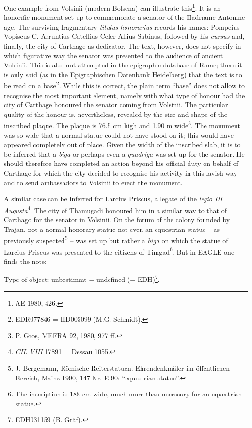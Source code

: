 \documentclass[amsthm,ebook]{saparticle}
\begin{document}
One example from Volsinii (modern Bolsena) can illustrate this\footnote{AE 1980, 426.}. It is an honorific 
monument set up to commemorate a senator of the Hadrianic-Antonine age. The surviving 
fragmentary \textit{titulus honorarius }records his names: Pompeius Vopiscus C. 
Arruntius Catellius Celer Allius Sabinus, followed by his \textit{cursus }and, 
finally, the city of Carthage as dedicator. The text, however, does not specify 
in which figurative way the senator was presented to the audience of ancient Volsinii. 
This is also not attempted in the epigraphic database of Rome; there it is only 
said (as in the Epigraphischen Datenbank Heidelberg) that the text is to be read 
on a base\footnote{EDR077846 = HD005099 (M.G. Schmidt).}. While this is correct, the plain term ``base'' does not allow to recognise 
the most important element, namely with what type of honour had the city of Carthage 
honoured the senator coming from Volsinii. The particular quality of the honour 
is, nevertheless, revealed by the size and shape of the inscribed plaque. The plaque 
is 76.5 cm high and 1.90 m wide\footnote{P. Gros, MEFRA 92, 1980, 977 ff.}. The monument was so wide that a normal statue 
could not have stood on it; this would have appeared completely out of place. Given 
the width of the inscribed slab, it is to be inferred that a \textit{biga }or perhaps 
even a \textit{quadriga} was set up for the senator\textit{.} He should therefore 
have completed an action beyond his official duty on behalf of Carthage for which 
the city decided to recognise his activity in this lavish way and to send ambassadors 
to Volsinii to erect the monument.      

A similar case can be inferred for Larcius Priscus, a legate of the \textit{legio 
III Augusta}\footnote{\emph{CIL VIII} 17891 = Dessau 1055.}. The city of Thamugadi honoured him in a similar way to that of Carthago 
for the senator in Volsinii. On the forum of the colony founded by Trajan, not 
a normal honorary statue not even an equestrian statue – as previously suspected\footnote{\label{note:18}J. Bergemann, Römische Reiterstatuen. Ehrendenkmäler im öffentlichen Bereich, Mainz 1990, 147 Nr. E 90:  ``equestrian statue''.} 
– was set up but rather a \textit{biga }on which the statue of Larcius Priscus 
was presented to the citizens of Timgad\footnote{The inscription is 188 cm wide, much more than necessary for an equestrian statue.}. But in EAGLE one finds the note: 

Type of object: unbestimmt = undefined (= EDH)\footnote{EDH031159 (B. Gräf).}. 
\end{document}
